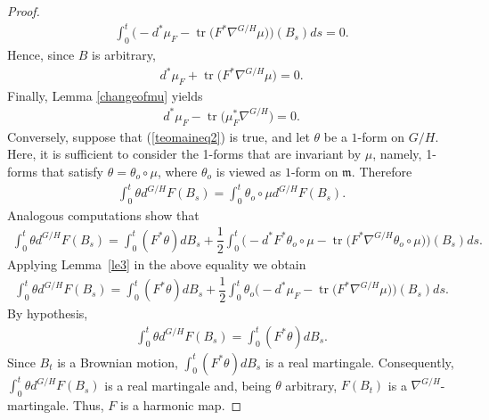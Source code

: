 \documentclass[10pt,a4paper]{amsart}
\numberwithin{equation}{section}
\newcommand{\m}{\mathfrak{m}}
\begin{document}
\begin{proof}
\begin{gather*}
    \int_0^t \big({-}d^{*}\mu_{F} - \operatorname{tr}\big(F^{*} \nabla^{G/H}\mu\big)\big)(B_{s}) ds = 0.
  \end{gather*}
  Hence, since $B$ is arbitrary,
  \begin{gather*}
    d^{*}\mu_{F}  +  \operatorname{tr}\big(F^{*} \nabla^{G/H}\mu\big) = 0.
  \end{gather*}
  Finally, Lemma \ref{changeofmu} yields
  \begin{gather}\label{teomaineq2}
    d^{*}\mu_{F}  -  \operatorname{tr}\big(\mu_{F}^* \nabla^{G/H}\big) =0.
  \end{gather}
  Conversely, suppose that (\ref{teomaineq2}) is true, and let $\theta$ be a $1$-form on $G/H$. Here, it is suf\/f\/icient to consider the 1-forms that are invariant by $\mu$, namely, 1-forms that satisfy $\theta = \theta_{o}\circ \mu$, where $\theta_o$ is viewed as $1$-form on  $\m$. Therefore
  \begin{gather*}
    \int_0^t \theta d^{G/H}F(B_{s}) = \int_0^t \theta_{o} \circ \mu  d^{G/H}F(B_{s}).
  \end{gather*}
  Analogous computations show that
  \begin{gather*}
    \int_0^t \theta d^{G/H}F(B_{s}) = \int_0^t (F^{*}\theta) dB_{s} + \dfrac{1}{2}\int_0^t \big({-}d^{*}F^{*}
    \theta_{o}\circ \mu - \operatorname{tr}\big(F^{*} \nabla^{G/H}\theta_{o} \circ \mu\big)\big)(B_{s})ds.
  \end{gather*}
  Applying Lemma~\ref{le3} in the above equality we obtain
  \begin{gather*}
    \int_0^t \theta d^{G/H}F(B_{s}) = \int_0^t (F^{*}\theta) dB_{s} + \dfrac{1}{2}\int_0^t\theta_{o}\big({-}d^{*}\mu_{F}
    - \operatorname{tr}\big(F^{*} \nabla^{G/H}\mu\big)\big)(B_{s}) ds.
  \end{gather*}
  By hypothesis,
  \begin{gather*}
    \int_0^t \theta d^{G/H}F(B_{s}) = \int_0^t (F^{*}\theta) dB_{s}.
  \end{gather*}
  Since $B_t$ is a Brownian motion, $\int_0^t (F^{*}\theta) dB_{s}$ is a real martingale. Consequently,  $\int_0^t \theta d^{G/H}F(B_{s})$ is a real martingale and, being $\theta$ arbitrary, $F(B_{t})$ is a
     $\nabla^{G/H}$-martingale. Thus, $F$ is a  harmonic map.
\end{proof}
\end{document}
